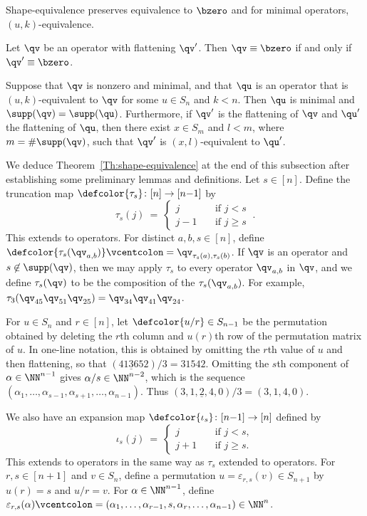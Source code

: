 Shape-equivalence preserves equivalence to $\bzero$ and for minimal operators, $(u,k)$-equivalence.


\begin{theorem}\label{Th:shape-equivalence}
  Let $\qv$ be an operator with flattening $\qv'$.
  Then $\qv\equiv\bzero$ if and only if $\qv'\equiv\bzero$.

  Suppose that $\qv$ is nonzero and minimal, and that $\qu$ is an operator that is $(u,k)$-equivalent to $\qv$
  for some $u\in S_n$ and $k<n$.
  Then $\qu$ is minimal and $\supp(\qv)=\supp(\qu)$.
  Furthermore, if $\qv'$ is the flattening of $\qv$ and $\qu'$ the flattening of $\qu$, then there exist
  $x\in S_m$ and $l<m$, where $m=\#\supp(\qv)$, such that $\qv'$ is $(x,l)$-equivalent to $\qu'$.
\end{theorem}

We deduce Theorem~\ref{Th:shape-equivalence} at the end of this subsection after establishing some preliminary lemmas and definitions.
Let $s\in[n]$.
Define the truncation map $\defcolor{\tau_s}\colon[n]\to[n{-}1]$ by
 \[
   \tau_s(j)\ =\ \left\{ \begin{array}{rcl} j&\ &\mbox{if }j<s\\ j{-}1&&\mbox{if } j\geq s\end{array}\right. \ .
 \]
This extends to operators.
For distinct $a,b,s\in[n]$, define $\defcolor{\tau_s(\qv_{a,b})}\vcentcolon=\qv_{\tau_s(a),\tau_s(b)}$.
If $\qv$ is an operator and $s\not\in\supp(\qv)$, then we may apply $\tau_s$ to every operator $\qv_{a,b}$ in $\qv$, and we
define $\tau_s(\qv)$ to be the composition of the $\tau_s(\qv_{a,b})$.
For example, $\tau_3(\qv_{45}\qv_{51}\qv_{25})=\qv_{34}\qv_{41}\qv_{24}$.

For $u\in S_n$ and $r\in[n]$, let $\defcolor{u/r}\in S_{n-1}$ be the permutation obtained by deleting the $r$th column and
$u(r)$th row of the permutation matrix of $u$.
In one-line notation, this is obtained by omitting the $r$th value of $u$ and then flattening, so that
$(41\underline{3}652)/3=31542$.
Omitting the $s$th component of  $\alpha\in\NN^{n-1}$ gives $\alpha/s\in\NN^{n-2}$, which is the sequence
$(\alpha_1,\dotsc,\alpha_{s-1},\alpha_{s+1},\dotsc,\alpha_{n-1})$.
Thus $(3,1,\underline{2},4,0)/3 = (3,1,4,0)$.

We also have an expansion map $\defcolor{\iota_s}\colon[n{-}1]\to[n]$ defined by
 \[
   \iota_s(j)\ =\ \left\{ \begin{array}{rcl} j&\ &\mbox{if }j<s,\\ j{+}1&&\mbox{if } j\geq s.\end{array}\right. 
 \]
This extends to operators in the same way as $\tau_s$ extended to operators.
For $r,s\in[n{+}1]$ and $v\in S_n$, define a permutation $u=\varepsilon_{r,s}(v)\in S_{n+1}$ by $u(r)=s$ and $u/r=v$.
For $\alpha\in\NN^{n-1}$, define $\varepsilon_{r,s}(\alpha)\vcentcolon=(\alpha_1,\dotsc,\alpha_{r{-}1},s,\alpha_r,\dotsc,\alpha_{n-1})\in\NN^{n}$.


